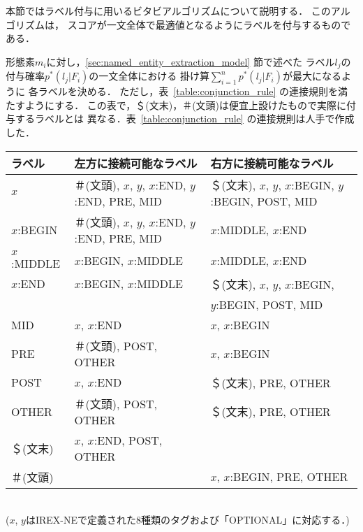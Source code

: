 本節ではラベル付与に用いるビタビアルゴリズムについて説明する．
このアルゴリズムは，
スコアが一文全体で最適値となるようにラベルを付与するものである．

形態素$m_i$に対し，\ref{sec:named_entity_extraction_model} 節で述べた
ラベル$l_{j}$の付与確率$p^{*}(l_{j}|F_{i})$の一文全体における
掛け算$\sum_{i=1}^{n} p^{*}(l_{j}|F_{i})$が最大になるように
各ラベルを決める．
ただし，表~\ref{table:conjunction_rule} の連接規則を満たすようにする．
この表で，＄(文末)，＃(文頭)は便宜上設けたもので実際に付与するラベルとは
異なる．表~\ref{table:conjunction_rule} の連接規則は人手で作成した．

  \begin{table*}[htbp]
    \begin{center}
      \caption{連接規則}
      \label{table:conjunction_rule} 
      \begin{tabular}[c]{|l|p{4.3cm}|p{4.8cm}|}
        \hline
        ラベル & 左方に接続可能なラベル & 右方に接続可能なラベル \\
        \hline
        $x$ & ＃(文頭), $x$, $y$, $x$:END, $y$:END, PRE, MID 
        & ＄(文末), $x$, $y$, $x$:BEGIN, $y$:BEGIN, POST, MID \\
        $x$:BEGIN & ＃(文頭), $x$, $y$, $x$:END, $y$:END, PRE, MID 
        & $x$:MIDDLE, $x$:END \\
        $x$:MIDDLE & $x$:BEGIN, $x$:MIDDLE & $x$:MIDDLE, $x$:END \\
        $x$:END & $x$:BEGIN, $x$:MIDDLE 
        & ＄(文末), $x$, $y$, $x$:BEGIN,\\ & & $y$:BEGIN, POST, MID \\
        MID & $x$, $x$:END & $x$, $x$:BEGIN \\
        PRE & ＃(文頭), POST, OTHER & $x$, $x$:BEGIN \\
        POST & $x$, $x$:END & ＄(文末), PRE, OTHER \\
        OTHER & ＃(文頭), POST, OTHER & ＄(文末), PRE, OTHER \\
        ＄(文末) & $x$, $x$:END, POST, OTHER & \\
        ＃(文頭) & & $x$, $x$:BEGIN, PRE, OTHER\\
        \hline
      \end{tabular}\\
      \vspace*{1em}
      ($x$, $y$はIREX-NEで定義された8種類のタグおよび「OPTIONAL」に対応する．)
    \end{center}
  \end{table*}

